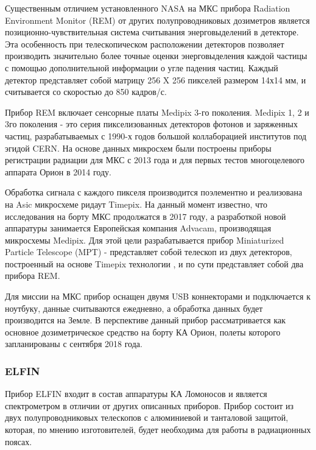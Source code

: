 Существенным отличием установленного NASA на МКС прибора Radiation Environment Monitor (REM) от других полупроводниковых дозиметров  является позиционно-чувствительная система считывания энерговыделений в детекторе. Эта особенность при телескопическом расположении детекторов позволяет производить значительно более точные оценки энерговыделения каждой частицы с помощью дополнительной информации о угле падения частиц. Каждый детектор представляет собой матрицу 256 X 256 пикселей размером 14х14 мм, и считывается со скоростью до 850 кадров/с.

Прибор REM включает сенсорные платы Medipix 3-го поколения. Medipix 1, 2 и 3го поколения - это серия пикселизованных детекторов фотонов и заряженных частиц, разрабатываемых с 1990-х годов большой коллаборацией институтов под эгидой CERN. На основе данных микросхем были построены приборы регистрации радиации для МКС с 2013 года и для первых тестов многоцелевого аппарата Орион в 2014 году.

Обработка сигнала с каждого пикселя производится поэлементно и реализована на Asic микросхеме ридаут Timepix. На данный момент известно, что исследования на борту МКС продолжатся в 2017 году, а разработкой новой аппаратуры занимается Европейская компания Advacam, производящая микросхемы Medipix. Для этой цели разрабатывается прибор Miniaturized Particle Telescope (MPT)\cite{Fry2016} - представляет собой телескоп из двух детекторов, построенный на основе Timepix технологии \cite{Kroupa2015}, и по сути представляет собой два прибора REM. 

Для миссии на МКС прибор оснащен двумя USB коннекторами и подключается к ноутбуку, данные считываются ежедневно, а обработка данных будет производится на Земле. В перспективе данный прибор рассматривается как основное дозиметрическое средство на борту КА Орион, полеты которого запланированы с сентября 2018 года.


\subsubsection{ELFIN}
Прибор ELFIN входит в состав аппаратуры КА Ломоносов и является спектрометром в отличии от других описанных приборов. Прибор состоит из двух полупроводниковых телескопов с алюминиевой и танталовой защитой, которая, по мнению изготовителей, будет необходима для работы в радиационных поясах.\cite{VassilisAngelopoulos}

